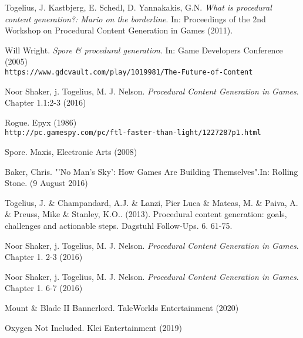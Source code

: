

\begin{thebibliography}{9}

 Togelius, J. Kastbjerg, E. Schedl, D. Yannakakis, G.N. \textit{What is procedural content generation?: Mario on the borderline}.  In: Proceedings of the 2nd Workshop on Procedural Content Generation in Games (2011).

 Will Wright. \textit{Spore \& procedural generation}. In: Game Developers Conference (2005) \\\texttt{https://www.gdcvault.com/play/1019981/The-Future-of-Content}
 
 Noor Shaker, j. Togelius, M. J. Nelson. \textit{Procedural Content Generation in Games}. Chapter 1.1:2-3 (2016)

 Rogue. Epyx (1986) \\
\texttt{http://pc.gamespy.com/pc/ftl-faster-than-light/1227287p1.html}

Spore. Maxis, Electronic Arts (2008)

Baker, Chris. "'No Man's Sky': How Games Are Building Themselves".In: Rolling Stone. (9 August 2016)


Togelius, J. \& Champandard, A.J. \& Lanzi, Pier Luca \& Mateas, M. \& Paiva, A. \& Preuss, Mike \& Stanley, K.O.. (2013). Procedural content generation: goals, challenges and actionable steps. Dagstuhl Follow-Ups. 6. 61-75. 

 Noor Shaker, j. Togelius, M. J. Nelson. \textit{Procedural Content Generation in Games}. Chapter 1. 2-3 (2016)

 Noor Shaker, j. Togelius, M. J. Nelson. \textit{Procedural Content Generation in Games}. Chapter 1. 6-7 (2016)

Mount \& Blade II Bannerlord. TaleWorlds Entertainment (2020)

Oxygen Not Included.  Klei Entertainment (2019)



\end{thebibliography}